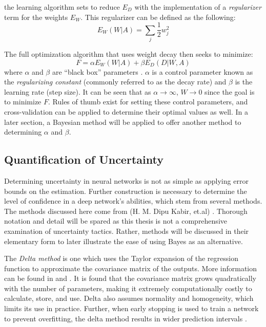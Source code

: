 the learning algorithm sets to reduce $E_D$ with the implementation of a \textit{regularizer} term for the weights $E_W$.  This regularizer can be defined as the following:
$$
E_W(W|A) = \sum_j \frac{1}{2} w_j^2
$$

The full optimization algorithm that uses weight decay then seeks to minimize:
$$
F = \alpha E_W(W|A) + \beta E_D(D|W,A)
$$
where $\alpha$ and $\beta$ are ``black box'' parameters \cite{mackay1992practical}.  $\alpha$ is a control parameter known as the \textit{regularizing constant} (commonly referred to as the decay rate) and $\beta$ is the learning rate (step size).  It can be seen that as $\alpha \rightarrow \infty$, $W \rightarrow 0$ since the goal is to minimize $F$.  Rules of thumb exist for setting these control parameters, and cross-validation can be applied to determine their optimal values as well.  In a later section, a Bayesian method will be applied to offer another method to determining $\alpha$ and $\beta$.

\subsection{Quantification of Uncertainty}

Determining uncertainty in neural networks is not as simple as applying error bounds on the estimation.  Further construction is necessary to determine the level of confidence in a deep network's abilities, which stem from several methods.  The methods discussed here come from (H. M. Dipu Kabir, et.al) \cite{8371683}.  Thorough notation and detail will be spared as this thesis is not a comprehensive examination of uncertainty tactics.  Rather, methods will be discussed in their elementary form to later illustrate the ease of using Bayes as an alternative.

The \textit{Delta method} is one which uses the Taylor expansion of the regression function to approximate the covariance matrix of the outputs.  More information can be found in \cite{nilsen2022epistemic} and \cite{hwang1997prediction}.  It is found that the covariance matrix grows quadratically with the number of parameters, making it extremely computationally costly to calculate, store, and use.  Delta also assumes normality and homogeneity, which limits its use in practice.  Further, when early stopping is used to train a network to prevent overfitting, the delta method results in wider prediction intervals \cite{8371683}.


